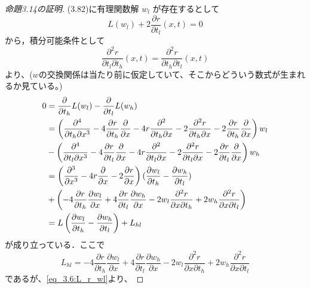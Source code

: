 \begin{story}

\begin{proof}[命題3.14の証明]
(3.82)に有理関数解 $w_l$ が存在するとして
\begin{equation}\label{eq_3.6:L_r_wl}
    L(w_l) + 2\frac{\partial r}{\partial t_l}(x,t) = 0
\end{equation}
から，積分可能条件として
\[
\frac{\partial^{2} r}{\partial t_l\partial t_{h}}(x,t)=\frac{\partial^{2} r}{\partial t_h\partial t_{l}}(x,t)
\]
より、($w$の交換関係は当たり前に仮定していて、そこからどういう数式が生まれるか見ている。)
\begin{align}
    0 &= \frac{\partial}{\partial t_h}L(w_l) - \frac{\partial}{\partial t_l}L(w_h)\notag\\
    &= \left(\frac{\partial^{4}}{\partial t_h\partial x^{3}}-4\frac{\partial r}{\partial t_{h}}\frac{\partial}{\partial x}-4r\frac{\partial^{2}}{\partial t_{h}\partial x}-2\frac{\partial^{2}r}{\partial t_{h}\partial x}-2\frac{\partial r}{\partial t_{h}}\frac{\partial}{\partial x}\right)w_{l}\notag\\
    &-\left(\frac{\partial^{4}}{\partial t_l\partial x^{3}}-4\frac{\partial r}{\partial t_{l}}\frac{\partial}{\partial x}-4r\frac{\partial^{2}}{\partial t_{l}\partial x}-2\frac{\partial^{2}r}{\partial t_{l}\partial x}-2\frac{\partial r}{\partial t_{l}}\frac{\partial}{\partial x}\right)w_{h}\notag\\
    &= \left(\frac{\partial^{3}}{\partial x^{3}}-4r\frac{\partial}{\partial x}-2\frac{\partial r}{\partial x}\right)(\frac{\partial w_{l}}{\partial t_{h}}-\frac{\partial w_{h}}{\partial t_{l}})\notag\\
    &+\left(-4\frac{\partial r}{\partial t_h}\frac{\partial w_l}{\partial x} + 4\frac{\partial r}{\partial t_l}\frac{\partial w_h}{\partial x} - 2w_l\frac{\partial^2 r}{\partial x \partial t_h} + 2w_h\frac{\partial^2 r}{\partial x \partial t_l}\right)\notag\\
    &= L\left( \frac{\partial w_l}{\partial t_h} - \frac{\partial w_h}{\partial t_l} \right) + L_{hl} \label{eq:3.84}
\end{align}
が成り立っている．ここで
\begin{equation*}
    L_{hl} = -4\frac{\partial r}{\partial t_h}\frac{\partial w_l}{\partial x} + 4\frac{\partial r}{\partial t_l}\frac{\partial w_h}{\partial x} - 2w_l\frac{\partial^2 r}{\partial x \partial t_h} + 2w_h\frac{\partial^2 r}{\partial x \partial t_l}
\end{equation*}
であるが、\eqref{eq_3.6:L_r_wl}より、

\end{proof}
\end{story}
